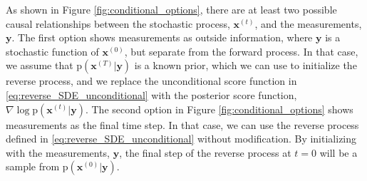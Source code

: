 \documentclass[12pt,]{article}
\begin{document}



As shown in Figure \ref{fig:conditional_options}, there are at least two possible causal relationships between the stochastic process, $\mathbf{x}^{(t)}$, and the measurements, $\mathbf{y}$. The first option shows measurements as outside information, where $\mathbf{y}$ is a stochastic function of $\mathbf{x}^{(0)}$, but separate from the forward process. In that case, we assume that $\text{p}(\mathbf{x}^{(T)}|\mathbf{y})$ is a known prior, which we can use to initialize the  reverse process, and we replace the unconditional score function in \eqref{eq:reverse_SDE_unconditional} with the posterior score function, $\nabla\log\text{p}(\mathbf{x}^{(t)}|\mathbf{y})$. The second option in Figure \ref{fig:conditional_options} shows measurements as the final time step. In that case, we can use the reverse process defined in \eqref{eq:reverse_SDE_unconditional} without modification. By initializing with the measurements, $\mathbf{y}$, the final step of the reverse process at $t=0$ will be a sample from $\text{p}(\mathbf{x}^{(0)}|\mathbf{y})$.
\end{document}
